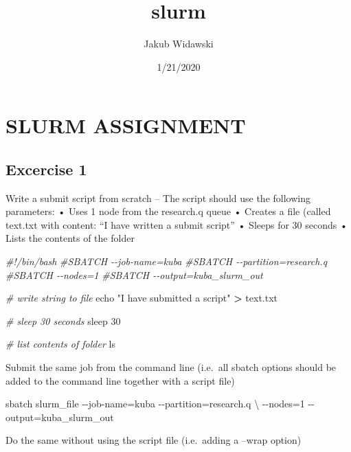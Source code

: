\documentclass[]{article}
\title{slurm}
\author{Jakub Widawski}
\date{1/21/2020}
\newenvironment{Shaded}{\begin{snugshade}}{\end{snugshade}}
\newcommand{\BuiltInTok}[1]{#1}
\newcommand{\CommentTok}[1]{\textcolor[rgb]{0.56,0.35,0.01}{\textit{#1}}}
\newcommand{\ExtensionTok}[1]{#1}
\newcommand{\FunctionTok}[1]{\textcolor[rgb]{0.00,0.00,0.00}{#1}}
\newcommand{\NormalTok}[1]{#1}
\newcommand{\OperatorTok}[1]{\textcolor[rgb]{0.81,0.36,0.00}{\textbf{#1}}}
\newcommand{\StringTok}[1]{\textcolor[rgb]{0.31,0.60,0.02}{#1}}
\begin{document}
\maketitle

\hypertarget{slurm-assignment}{%
\section{SLURM ASSIGNMENT}\label{slurm-assignment}}

\hypertarget{excercise-1}{%
\subsection{Excercise 1}\label{excercise-1}}

Write a submit script from scratch -- The script should use the
following parameters: • Uses 1 node from the research.q queue • Creates
a file (called text.txt with content: ``I have written a submit script''
• Sleeps for 30 seconds • Lists the contents of the folder

\begin{Shaded}
\begin{Highlighting}[]
\CommentTok{\#!/bin/bash}
\CommentTok{\#SBATCH {-}{-}job{-}name=kuba}
\CommentTok{\#SBATCH {-}{-}partition=research.q}
\CommentTok{\#SBATCH {-}{-}nodes=1}
\CommentTok{\#SBATCH {-}{-}output=kuba\_slurm\_out}

\CommentTok{\# write string to file}
\BuiltInTok{echo} \StringTok{"I have submitted a script"} \OperatorTok{>}\NormalTok{ text.txt}

\CommentTok{\# sleep 30 seconds}
\FunctionTok{sleep}\NormalTok{ 30 }

\CommentTok{\# list contents of folder}
\FunctionTok{ls}
\end{Highlighting}
\end{Shaded}

Submit the same job from the command line (i.e.~all sbatch options
should be added to the command line together with a script file)

\begin{Shaded}
\begin{Highlighting}[]
\ExtensionTok{sbatch}\NormalTok{ slurm\_file {-}{-}job{-}name=kuba {-}{-}partition=research.q \textbackslash{}}
\NormalTok{                  {-}{-}nodes=1 {-}{-}output=kuba\_slurm\_out}
\end{Highlighting}
\end{Shaded}

Do the same without using the script file (i.e.~adding a --wrap option)
\end{document}
